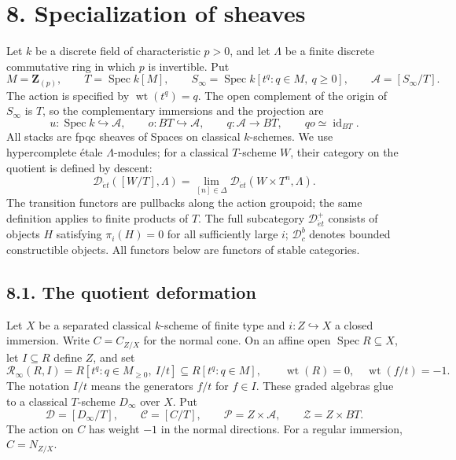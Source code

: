 \documentclass[11pt,a4paper]{article}
\newcommand{\Z}{\mathbf Z}
\newcommand{\Spec}{\operatorname{Spec}}
\newcommand{\wt}{\operatorname{wt}}
\newcommand{\Det}{\mathcal D_{\acute et}}
\newcommand{\Dc}{\mathcal D^b_c}
\newcommand{\cA}{\mathscr A}
\newcommand{\cD}{\mathscr D}
\newcommand{\cC}{\mathscr C}
\newcommand{\cP}{\mathscr P}
\newcommand{\cZ}{\mathscr Z}
\newcommand{\Rinf}{\mathcal R_\infty}
\theoremstyle{notes}
\begin{document}
\setcounter{section}{8}
\section*{8. Specialization of sheaves}

Let $k$ be a discrete field of characteristic $p>0$, and let $\Lambda$ be a finite discrete commutative ring in which $p$ is invertible. Put
\[
M=\Z_{(p)},\qquad T=\Spec k[M],\qquad
S_\infty=\Spec k[t^q:q\in M,\ q\geq0],\qquad \cA=[S_\infty/T].
\]
The action is specified by $\wt(t^q)=q$. The open complement of the origin of $S_\infty$ is $T$, so the complementary immersions and the projection are
\[
u:\Spec k\hookrightarrow\cA,\qquad o:BT\hookrightarrow\cA,
\qquad q:\cA\longrightarrow BT,\qquad qo\simeq\operatorname{id}_{BT}.
\]
All stacks are fpqc sheaves of Spaces on classical $k$-schemes. We use hypercomplete étale $\Lambda$-modules; for a classical $T$-scheme $W$, their category on the quotient is defined by descent:
\[
\Det([W/T],\Lambda)=\lim_{[n]\in\Delta}\Det(W\times T^n,\Lambda).
\]
The transition functors are pullbacks along the action groupoid; the same definition applies to finite products of $T$. The full subcategory $\Det^+$ consists of objects $H$ satisfying $\pi_i(H)=0$ for all sufficiently large $i$; $\Dc$ denotes bounded constructible objects. All functors below are functors of stable categories.

\subsection*{8.1. The quotient deformation}

Let $X$ be a separated classical $k$-scheme of finite type and $i:Z\hookrightarrow X$ a closed immersion. Write $C=C_{Z/X}$ for the normal cone. On an affine open $\Spec R\subseteq X$, let $I\subseteq R$ define $Z$, and set
\begin{equation}\label{eq:algebra}
\Rinf(R,I)=R[t^q:q\in M_{\geq0},\ I/t]\subseteq R[t^q:q\in M],
\qquad \wt(R)=0,\quad \wt(f/t)=-1.
\end{equation}
The notation $I/t$ means the generators $f/t$ for $f\in I$. These graded algebras glue to a classical $T$-scheme $D_\infty$ over $X$. Put
\[
\cD=[D_\infty/T],\qquad \cC=[C/T],\qquad
\cP=Z\times\cA,\qquad \cZ=Z\times BT.
\]
The action on $C$ has weight $-1$ in the normal directions. For a regular immersion, $C=N_{Z/X}$.
\end{document}
